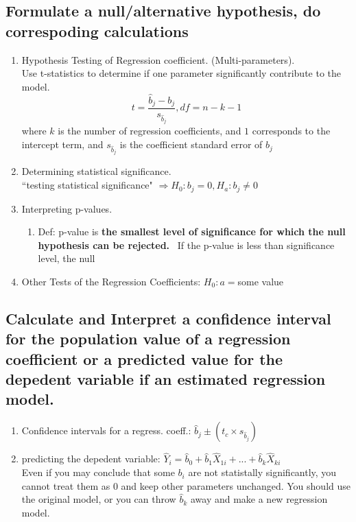 \documentclass{article}
\begin{document}
\subsection{Formulate a null/alternative hypothesis, do correspoding calculations}
\begin{enumerate}
    \item Hypothesis Testing of Regression coefficient. (Multi-parameters). \\
        Use t-statistics to determine if one parameter significantly contribute
        to the model.
        $$
            t=\frac{\hat{b}_j-b_j}{s_{\hat{b}_j}}, df=n-k-1
        $$
        where $k$ is the number of regression coefficients, and $1$ corresponds to
        the intercept term, and $s_{\hat{b}_j}$ is the coefficient standard error
        of $b_j$
    \item Determining statistical significance.
        \\ ``testing statistical significance" $\Rightarrow H_0: b_j=0, H_a: b_j\ne 0$
    \item Interpreting p-values.
        \begin{enumerate}
            \item Def: p-value is {\bf the smallest level of significance for 
                which the null hypothesis can be rejected.}
                \ If the p-value is less than significance level, the null 
        \end{enumerate}
    \item Other Tests of the Regression Coefficients: $H_0: a=$some value
\end{enumerate}
\subsection{Calculate and Interpret a confidence interval for the population 
value of a regression coefficient or a predicted value for the depedent variable
if an estimated regression model.}
\begin{enumerate}
    \item Confidence intervals for a regress. coeff.: $\hat{b}_j\pm(t_c\times s_{\hat{b}_j})$
    \item predicting the depedent variable: 
        $\hat{Y}_i=\hat{b}_0+\hat{b}_1 \hat{X}_{1i}+...+\hat{b}_k \hat{X}_{ki}$
        \\Even if you may conclude that some $b_i$ are not statistally significantly, you cannot
        treat them as $0$ and keep other parameters unchanged. You should use the
        original model, or you can throw $\hat{b}_k$ away and make a new regression model.
\end{enumerate}
\end{document}
